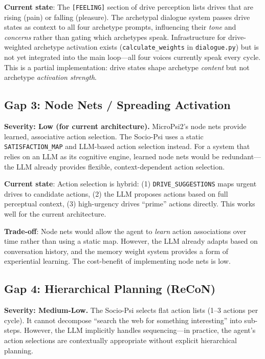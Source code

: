 \documentclass[11pt,letterpaper]{article}
\begin{document}
\textbf{Current state}: The \texttt{[FEELING]} section of drive perception
lists drives that are rising (pain) or falling (pleasure). The archetypal
dialogue system passes drive states as context to all four archetype
prompts, influencing their \emph{tone} and \emph{concerns} rather than
gating which archetypes speak. Infrastructure for drive-weighted archetype
activation exists (\texttt{calculate\_weights} in \texttt{dialogue.py}) but
is not yet integrated into the main loop---all four voices currently speak
every cycle. This is a partial implementation: drive states shape archetype
\emph{content} but not archetype \emph{activation strength}.

\subsection{Gap 3: Node Nets / Spreading Activation}

\begin{gapbox}
\textbf{Severity: Low (for current architecture).} MicroPsi2's node nets
provide learned, associative action selection. The Socio-Psi uses a static
\texttt{SATISFACTION\_MAP} and LLM-based action selection instead. For a
system that relies on an LLM as its cognitive engine, learned node nets
would be redundant---the LLM already provides flexible, context-dependent
action selection.
\end{gapbox}

\textbf{Current state}: Action selection is hybrid: (1) \texttt{DRIVE\_SUGGESTIONS}
maps urgent drives to candidate actions, (2) the LLM proposes actions based
on full perceptual context, (3) high-urgency drives ``prime'' actions directly.
This works well for the current architecture.

\textbf{Trade-off}: Node nets would allow the agent to \emph{learn} action
associations over time rather than using a static map. However, the LLM
already adapts based on conversation history, and the memory weight system
provides a form of experiential learning. The cost-benefit of implementing
node nets is low.

\subsection{Gap 4: Hierarchical Planning (ReCoN)}

\begin{gapbox}
\textbf{Severity: Medium-Low.} The Socio-Psi selects flat action lists (1--3
actions per cycle). It cannot decompose ``search the web for something
interesting'' into sub-steps. However, the LLM implicitly handles
sequencing---in practice, the agent's action selections are contextually
appropriate without explicit hierarchical planning.
\end{gapbox}
\end{document}
